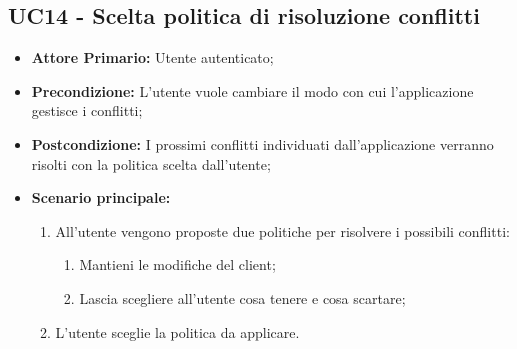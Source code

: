 \subsection{UC14 - Scelta politica di risoluzione conflitti}
\label{UC14}
\begin{itemize}
\item \textbf{Attore Primario:} Utente autenticato;
\item \textbf{Precondizione:} L'utente vuole cambiare il modo con cui l'applicazione gestisce i conflitti;
\item \textbf{Postcondizione:} I prossimi conflitti individuati dall'applicazione verranno risolti con la politica scelta dall'utente;
\item \textbf{Scenario principale:}
    \begin{enumerate}
    \item All'utente vengono proposte due politiche per risolvere i possibili conflitti:
        \begin{enumerate}
        \item Mantieni le modifiche del client;
        \item Lascia scegliere all'utente cosa tenere e cosa scartare;
        \end{enumerate}
    \item L'utente sceglie la politica da applicare.
    \end{enumerate}
\end{itemize}